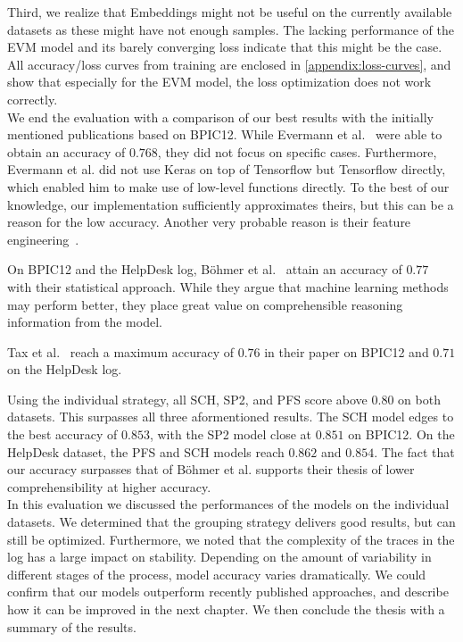 Third, we realize that Embeddings might not be useful on the currently available datasets as these might have not enough samples. The lacking performance of the EVM model and its barely converging loss indicate that this might be the case. All accuracy/loss curves from training are enclosed in \autoref{appendix:loss-curves}, and show that especially for the EVM model, the loss optimization does not work correctly.\\

We end the evaluation with a comparison of our best results with the initially mentioned publications based on BPIC12. While Evermann et al.~\cite{evermann2016} were able to obtain an accuracy of $0.768$, they did not focus on specific cases. Furthermore, Evermann et al. did not use Keras on top of Tensorflow but Tensorflow directly, which enabled him to make use of low-level functions directly. To the best of our knowledge, our implementation sufficiently approximates theirs, but this can be a reason for the low accuracy. Another very probable reason is their feature engineering~\cite{evermann2016}.

On BPIC12 and the HelpDesk log, Böhmer et al.~\cite{boehmer2018probability} attain an accuracy of $0.77$ with their statistical approach. While they argue that machine learning methods may perform better, they place great value on comprehensible reasoning information from the model.

Tax et al.~\cite{tax2017} reach a maximum accuracy of $0.76$ in their paper on BPIC12 and $0.71$ on the HelpDesk log.

Using the individual strategy, all SCH, SP2, and PFS score above $0.80$ on both datasets.
This surpasses all three aformentioned results.
The SCH model edges to the best accuracy of $0.853$, with the SP2 model close at $0.851$ on BPIC12.
On the HelpDesk dataset, the PFS and SCH models reach $0.862$ and $0.854$.
The fact that our accuracy surpasses that of Böhmer et al. supports their thesis of lower comprehensibility at higher accuracy.\\

In this evaluation we discussed the performances of the models on the individual datasets.
We determined that the grouping strategy delivers good results, but can still be optimized.
Furthermore, we noted that the complexity of the traces in the log has a large impact on stability.
Depending on the amount of variability in different stages of the process, model accuracy varies dramatically.
We could confirm that our models outperform recently published approaches, and describe how it can be improved in the next chapter.
We then conclude the thesis with a summary of the results.
